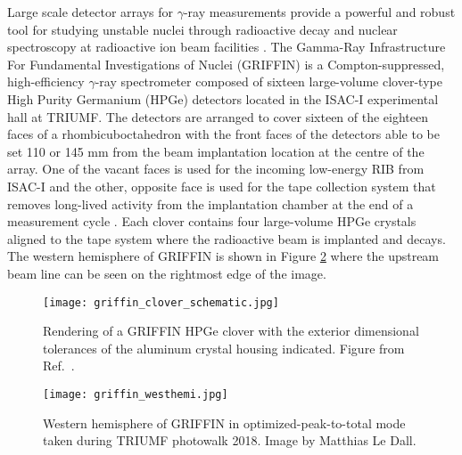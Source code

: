 \documentclass[cnatzke_thesis_proposal.tex]{subfiles}
\begin{document}
Large scale detector arrays for $\gamma$-ray measurements provide a powerful and robust tool for studying unstable nuclei through radioactive decay and nuclear spectroscopy at radioactive ion beam facilities \cite{garnsworthy_griffin_2019}. 
The Gamma-Ray Infrastructure For Fundamental Investigations of Nuclei (GRIFFIN) is a Compton-suppressed, high-efficiency $\gamma$-ray spectrometer composed of sixteen large-volume clover-type High Purity Germanium (HPGe) detectors located in the ISAC-I experimental hall at TRIUMF. 
The detectors are arranged to cover sixteen of the eighteen faces of a rhombicuboctahedron with the front faces of the detectors able to be set 110 or 145 mm from the beam implantation location at the centre of the array. 
One of the vacant faces is used for the incoming low-energy RIB from ISAC-I and the other, opposite face is used for the tape collection system that removes long-lived activity from the implantation chamber at the end of a measurement cycle \cite{garnsworthy_griffin_2019}. Each clover contains four large-volume HPGe crystals aligned to the tape system where the radioactive beam is implanted and decays. 
The western hemisphere of GRIFFIN is shown in Figure \ref{fig:griffin_westhemi} where the upstream beam line can be seen on the rightmost edge of the image. 

\begin{center}
  \begin{figure}[H]
    \begin{center}
      \texttt{[image: griffin\_clover\_schematic.jpg]}
    \end{center}
    \caption{Rendering of a GRIFFIN HPGe clover with the exterior dimensional tolerances of the aluminum crystal housing indicated. Figure from Ref.~\cite{rizwan_characteristics_2016}.}
    \label{fig:griffin_clover_schematic}
  \end{figure}
\end{center}

\begin{center}
  \begin{figure}[H]
    \begin{center}
      \texttt{[image: griffin\_westhemi.jpg]}
    \end{center}
    \caption{Western hemisphere of GRIFFIN in optimized-peak-to-total mode taken during TRIUMF photowalk 2018. Image by Matthias Le Dall.}
    \label{fig:griffin_westhemi}
  \end{figure}
\end{center}
\end{document}
